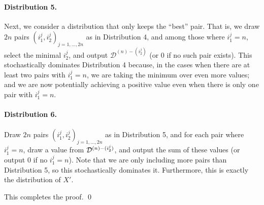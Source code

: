     \paragraph{Distribution 5.} Next, we consider a distribution that only keeps the ``best'' pair.  That is, we draw $2n$ pairs  $(i^j_1, i^j_2)_{j = 1, \ldots, 2n}$ as in Distribution 4, and among those where $i^j_1 = n$, select the minimal $i^j_2$, and output $\mathcal{D}^{(n) - (i^j_2)}$ (or $0$ if no such pair exists). This stochastically dominates Distribution 4 because, in the cases when there are at least two pairs with $i^j_1 = n$, we are taking the minimum over even more values; and we are now potentially achieving a positive value even when there is only one pair with $i^j_1 = n$.

     \paragraph{Distribution 6.} Draw $2n$ pairs $(i^j_1, i^j_2)_{j = 1, \ldots, 2n}$ as in Distribution 5, and for each pair where $i^j_1 = n$, draw a value from $\mathcal{D}^{(n) - (i^j_2)}$, and output the sum of these values (or output  $0$ if no $i^j_1 = n$). Note that we are only including more pairs than Distribution 5, so this stochastically dominates it. Furthermore, this is exactly the distribution of $X'$.  

     This completes the proof. \qed
    

    




